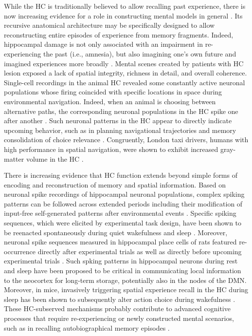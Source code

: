 \documentclass[10pt,letterpaper]{article}
\begin{document}
While the HC
is traditionally believed to allow recalling past experience,
there is now increasing evidence for a role
in constructing mental models in general
\citep{maguire2016, schacter2007remembering, gelbard2008internally, Javadi2017,
boyer2008evolutionary}.
Its recursive anatomical architecture
may be specifically designed to allow reconstructing
entire episodes of experience from memory fragments.
Indeed,
hippocampal damage is
not only associated with an impairment in re-experiencing the past (i.e., amnesia),
but also imagining one's own future and
imagined experiences more broadly \citep{hassabis2007patients}.
Mental scenes created by patients with HC lesion exposed a lack of
spatial integrity, richness in detail, and overall coherence.
%
Single-cell recordings in the animal HC revealed
some constantly active neuronal populations whose firing coincided with
specific locations in space during environmental navigation.
Indeed, when an animal is choosing between alternative
paths, the corresponding neuronal populations in the HC
spike one after another  \citep{johnson2007neural}.
Such neuronal patterns in the HC appear to directly indicate upcoming behavior,
such as in planning navigational trajectories
\citep{pfeiffer2013hippocampal} and
memory consolidation of choice relevance \citep{lavilleon2015}.
Congruently,
London taxi drivers, humans with high performance in spatial navigation,
were shown to exhibit increased gray-matter volume in the
HC \citep{maguire2000navigation}.


There is increasing evidence that
HC function extends beyond simple forms of
encoding and reconstruction of memory and spatial information.
Based on neuronal spike recordings of hippocampal neuronal populations,
complex spiking patterns can be followed across extended periods including
their modification of input-free self-generated patterns
after environmental events \citep{buzsaki2004large}.
Specific spiking sequences, which were elicited by experimental task design,
have been shown to be reenacted spontaneously during
quiet wakefulness and sleep \citep{hartley2014space, o2010play}.
Moreover, neuronal spike sequences measured in hippocampal place cells of rats
featured re-occurrence directly after experimental trials
as well as directly before upcoming experimental trials \citep{diba2007forward}.
Such spking patterns in hippocampal neurons during rest and sleep
have been proposed to be critical in communicating local information
to the neocortex for long-term storage, potentially also in the nodes of the DMN.
Moreover, in mice, invasively triggering spatial experience recall
in the HC during sleep
has been shown to subsequently alter action choice during wakefulness
\citep{lavilleon2015}.
These HC-subserved mechanisms
probably contribute to advanced cognitive processes that require
re-experiencing or newly constructed mental scenarios,
such as in recalling autobiographical memory episodes
\citep{hassabis2007patients}.
\end{document}

